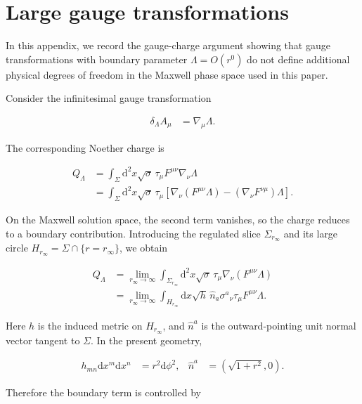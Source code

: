 \section{Large gauge transformations}\label{app:large-gauge-transformations}

In this appendix, we record the gauge-charge argument showing that gauge transformations with boundary parameter $\Lambda=O(r^{0})$ do not define additional physical degrees of freedom in the Maxwell phase space used in this paper.

Consider the infinitesimal gauge transformation

\begin{align}
\delta_{\Lambda}A_{\mu}&=\nabla_{\mu}\Lambda.
\end{align}

The corresponding Noether charge is

\begin{align}
Q_{\Lambda}
&=\int_{\Sigma}\mathrm{d}^{2}x\sqrt{\sigma}\,\tau_{\mu}F^{\mu\nu}\nabla_{\nu}\Lambda \\
&=\int_{\Sigma}\mathrm{d}^{2}x\sqrt{\sigma}\,\tau_{\mu}\left[\nabla_{\nu}\left(F^{\mu\nu}\Lambda\right)-\left(\nabla_{\nu}F^{\nu\mu}\right)\Lambda\right].
\end{align}

On the Maxwell solution space, the second term vanishes, so the charge reduces to a boundary contribution. Introducing the regulated slice $\Sigma_{r_{\infty}}$ and its large circle $H_{r_{\infty}}=\Sigma\cap\{r=r_{\infty}\}$, we obtain

\begin{align}
Q_{\Lambda}
&=\lim_{r_{\infty}\to\infty}\int_{\Sigma_{r_{\infty}}}\mathrm{d}^{2}x\sqrt{\sigma}\,\tau_{\mu}\nabla_{\nu}\left(F^{\mu\nu}\Lambda\right) \\
&=\lim_{r_{\infty}\to\infty}\int_{H_{r_{\infty}}}\mathrm{d}x\sqrt{h}\,\hat{n}_{a}\sigma^{a}{}_{\nu}\tau_{\mu}F^{\mu\nu}\Lambda.
\end{align}

Here $h$ is the induced metric on $H_{r_{\infty}}$, and $\hat n^a$ is the outward-pointing unit normal vector tangent to $\Sigma$. In the present geometry,

\begin{align}
h_{mn}\mathrm{d}x^{m}\mathrm{d}x^{n}&=r^{2}\mathrm{d}\phi^{2}, &
\hat{n}^{a}&=\left(\sqrt{1+r^{2}},0\right).
\end{align}

Therefore the boundary term is controlled by

